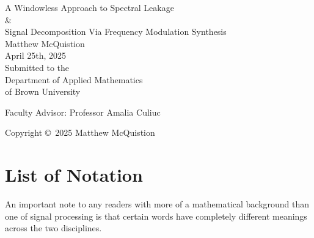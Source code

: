 \documentclass[11pt,twoside]{report}
\numberwithin{thm}{section}
\numberwithin{equation}{section}
\begin{document}

\setlength{\baselineskip}{21pt}





\begin{titlepage}
\mbox{}
\vspace{1in}
\begin{center}
\LARGE A Windowless Approach to Spectral Leakage \\ \& \\Signal Decomposition Via Frequency Modulation Synthesis \\
 [2in]
\normalsize  Matthew McQuistion \\[\medskipamount]
April 25th, 2025 \\[1in]
Submitted to the \\
Department of Applied Mathematics \\
of Brown University  \\

\end{center}
\vfill
\begin{center}
Faculty Advisor: Professor Amalia Culiuc
\end{center}
\vfill
\begin{center}
Copyright \copyright\ 2025 Matthew McQuistion
\end{center}
\end{titlepage}









\tableofcontents






\chapter*{List of Notation}
An important note to any readers with more of a mathematical background than one of signal processing is that certain words have completely different meanings across the two disciplines.\\
\end{document}
